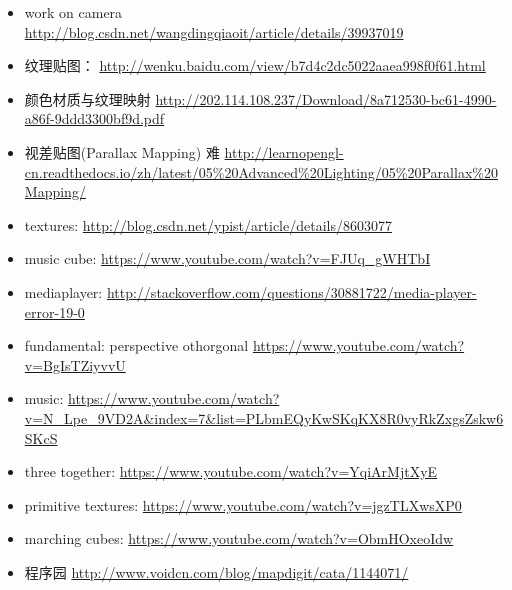 \documentclass[9pt,b5paper]{article}
\begin{document}
\begin{itemize}
\item work on camera \url{http://blog.csdn.net/wangdingqiaoit/article/details/39937019}
\item 纹理贴图： \url{http://wenku.baidu.com/view/b7d4c2dc5022aaea998f0f61.html}
\item 颜色材质与纹理映射 \url{http://202.114.108.237/Download/8a712530-bc61-4990-a86f-9ddd3300bf9d.pdf}
\item 视差贴图(Parallax Mapping) 难 \url{http://learnopengl-cn.readthedocs.io/zh/latest/05\%20Advanced\%20Lighting/05\%20Parallax\%20Mapping/}
\item textures: \url{http://blog.csdn.net/ypist/article/details/8603077}
\item music cube: \url{https://www.youtube.com/watch?v=FJUq_gWHTbI}
\item mediaplayer: \url{http://stackoverflow.com/questions/30881722/media-player-error-19-0}
\item fundamental: perspective othorgonal \url{https://www.youtube.com/watch?v=BgIsTZiyvvU}
\item music: \url{https://www.youtube.com/watch?v=N_Lpe_9VD2A&index=7&list=PLbmEQyKwSKqKX8R0vyRkZxgsZskw6SKcS}
\item three together: \url{https://www.youtube.com/watch?v=YqiArMjtXyE}
\item primitive textures: \url{https://www.youtube.com/watch?v=jgzTLXwsXP0}
\item marching cubes: \url{https://www.youtube.com/watch?v=ObmHOxeoIdw}
\item 程序园 \url{http://www.voidcn.com/blog/mapdigit/cata/1144071/}
\end{itemize}
\end{document}
